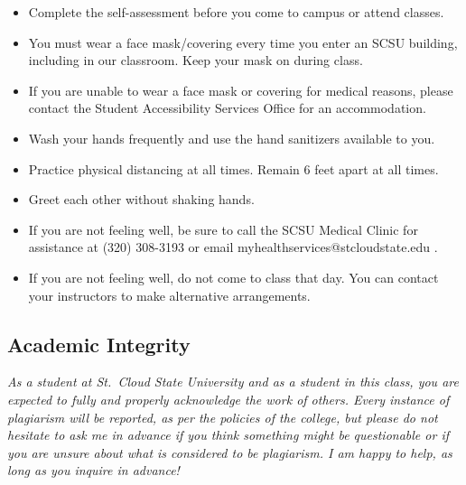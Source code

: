 \documentclass{tufte-handout}
\begin{document}
\begin{fullwidth}
\begin{itemize}
\item Complete the self-assessment before you come to campus or attend classes.
\item You must wear a face mask/covering every time you enter an SCSU building, including in our classroom. Keep your mask on during class.
\item If you are unable to wear a face mask or covering for medical reasons, please contact the Student Accessibility Services Office for an accommodation.
\item Wash your hands frequently and use the hand sanitizers available to you.
\item Practice physical distancing at all times. Remain 6 feet apart at all times.
\item Greet each other without shaking hands.
\item If you are not feeling well, be sure to call the SCSU Medical Clinic for assistance at (320) 308-3193 or email myhealthservices@stcloudstate.edu .
\item If you are not feeling well, do not come to class that day. You can contact your instructors to make alternative arrangements.
\end{itemize}

\subsection{Academic Integrity}




\emph{As a student at St.~Cloud State University and as a student in this class, you are expected to fully and properly acknowledge the work of others. Every instance of plagiarism will be reported, as per the policies of the college, but please do not hesitate to ask me in advance if you think something might be questionable or if you are unsure about what is considered to be plagiarism. I am happy to help, as long as you inquire in advance! }


\end{fullwidth}
\end{document}
